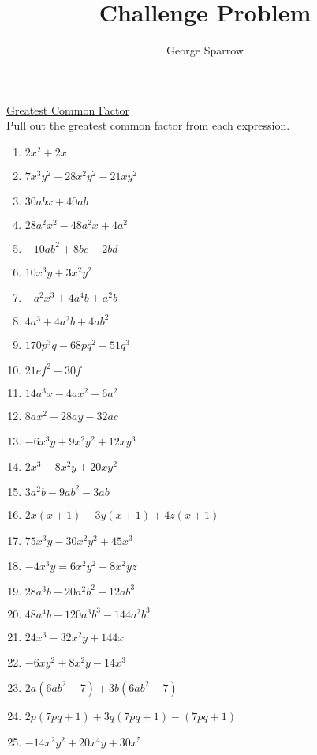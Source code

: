 \documentclass{article}
\title{Challenge Problem}
\date{\mydate}
\author{George Sparrow}
\begin{document}
\maketitle
\newpage

\underline{Greatest Common Factor} \\
Pull out the greatest common factor from each expression. \\
\begin{enumerate}
\item $2x^{2} + 2x$
\item $7x^{3}y^{2} + 28x^{2}y^{2} - 21xy^{2}$
\item $30abx + 40ab$
\item $28a^{2}x^{2} - 48a^{2}x + 4a^{2}$
\item $-10ab^{2} + 8bc - 2bd$
\item $10x^{3}y + 3x^{2}y^{2}$
\item $-a^{2}x^{3} + 4a^{4}b + a^{2}b$
\item $4a^{3} + 4a^{2}b + 4ab^{2}$
\item $170p^{3}q - 68pq^{2} + 51q^{3}$
\item $21ef^{2} - 30f$
\item $14a^{3}x - 4ax^{2} - 6a^{2}$
\item $8ax^{2} + 28ay - 32ac$
\item $-6x^{3}y + 9x^{2}y^{2} + 12xy^{3}$
\item $2x^{3} - 8x^{2}y + 20xy^{2}$
\item $3a^{2}b - 9ab^{2} - 3ab$
\item $2x(x+1) - 3y(x+1) + 4z(x+1)$
\item $75x^{3}y - 30x^{2}y^{2} + 45x^{3}$
\item $-4x^{3}y = 6x^{2}y^{2} - 8x^{2}yz$
\item $28a^{3}b - 20a^{2}b^{2} - 12ab^{3}$
\item $48a^{4}b - 120a^{3}b^{3} - 144a^{2}b^{3}$
\item $24x^{3} - 32x^{2}y + 144x$
\item $-6xy^{2} + 8x^{2}y - 14x^{3}$
\item $2a(6ab^{2}-7) + 3b(6ab^{2}-7)$
\item $2p(7pq+1) + 3q(7pq+1) - (7pq+1)$
\item $-14x^{2}y^{2} + 20x^{4}y + 30x^{5}$
\end{enumerate}
\end{document}
